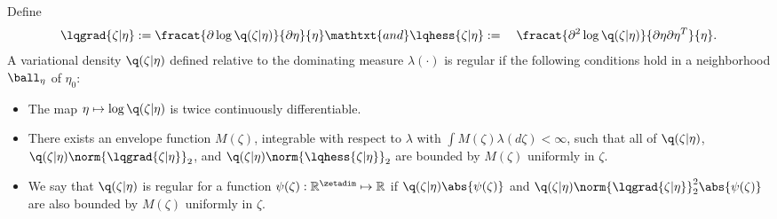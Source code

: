 
\begin{assu}
%
Define
%
\begin{align*}
%
\lqgrad{\zeta \vert \eta} :={}&
    \fracat{\partial \log \q(\zeta \vert \eta)}{\partial \eta}{\eta}
    \mathtxt{and}
%
\lqhess{\zeta \vert \eta} :={}&
    \fracat{\partial^2 \log \q(\zeta \vert \eta)}
           {\partial \eta \partial \eta^T}{\eta}.
%
\end{align*}
%
A variational density $\q(\zeta \vert \eta)$ defined relative to the dominating
measure $\lambda(\cdot)$ is regular if the following conditions hold in a
neighborhood $\ball_\eta$ of $\eta_0$:
%
\begin{itemize}
%
\item  The map $\eta \mapsto \log \q(\zeta \vert \eta)$ is twice continuously
differentiable.
%
\item  There exists an envelope function $M(\zeta)$, integrable with respect to
$\lambda$ with $\int M(\zeta) \lambda(d\zeta) < \infty$, such that
all of $\q(\zeta \vert \eta)$, $\q(\zeta \vert \eta) \norm{\lqgrad{\zeta \vert \eta}}_2$,
and $\q(\zeta \vert \eta) \norm{\lqhess{\zeta \vert \eta}}_2$ are
bounded by $M(\zeta)$ uniformly in $\zeta$.
%
\item We say that $\q(\zeta \vert \eta)$ is regular for a function $\psi(\zeta):
\mathbb{R}^\zetadim \mapsto \mathbb{R}$ if $\q(\zeta \vert \eta)
\abs{\psi(\zeta)}$ and $\q(\zeta \vert \eta) \norm{\lqgrad{\zeta \vert
\eta}}_2^2 \abs{\psi(\zeta)}$ are also bounded by $M(\zeta)$ uniformly in
$\zeta$.
%
\end{itemize}
%
%
\end{assu}
%

